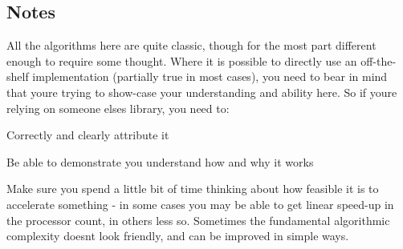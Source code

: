 \subsection*{Notes }

All the algorithms here are quite classic, though for the most part different enough to require some thought. Where it is possible to directly use an off-\/the-\/shelf implementation (partially true in most cases), you need to bear in mind that you\textquotesingle{}re trying to show-\/case your understanding and ability here. So if you\textquotesingle{}re relying on someone elses library, you need to\+:


\begin{DoxyItemize}
\item Correctly and clearly attribute it
\item Be able to demonstrate you understand how and why it works
\end{DoxyItemize}

Make sure you spend a little bit of time thinking about how feasible it is to accelerate something -\/ in some cases you may be able to get linear speed-\/up in the processor count, in others less so. Sometimes the fundamental algorithmic complexity doesn\textquotesingle{}t look friendly, and can be improved in simple ways. 